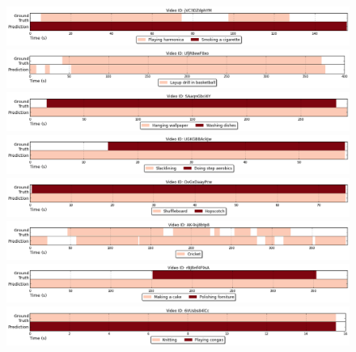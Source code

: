\begin{figure}[H]
\begin{center}
\includegraphics[width=1\linewidth]{img/results/activity_detection/activity_temporal_localization_24}
\includegraphics[width=1\linewidth]{img/results/activity_detection/activity_temporal_localization_25}
\includegraphics[width=1\linewidth]{img/results/activity_detection/activity_temporal_localization_26}
\includegraphics[width=1\linewidth]{img/results/activity_detection/activity_temporal_localization_27}
\includegraphics[width=1\linewidth]{img/results/activity_detection/activity_temporal_localization_28}
\includegraphics[width=1\linewidth]{img/results/activity_detection/activity_temporal_localization_29}
\includegraphics[width=1\linewidth]{img/results/activity_detection/activity_temporal_localization_30}
\includegraphics[width=1\linewidth]{img/results/activity_detection/activity_temporal_localization_31}

\end{center}
\end{figure}
